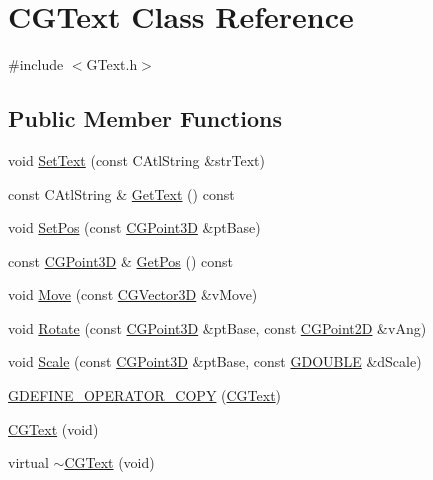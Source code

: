 \hypertarget{class_c_g_text}{}\section{C\+G\+Text Class Reference}
\label{class_c_g_text}


{\ttfamily \#include $<$G\+Text.\+h$>$}

\subsection*{Public Member Functions}
\begin{DoxyCompactItemize}
\item 
void \hyperlink{class_c_g_text_a916a400586bdfd83d2c8130fc397d2a7}{Set\+Text} (const C\+Atl\+String \&str\+Text)
\item 
const C\+Atl\+String \& \hyperlink{class_c_g_text_ad96b2b016d0806dd239425aad067026a}{Get\+Text} () const 
\item 
void \hyperlink{class_c_g_text_a787289d64e1be316b6031fd5075b2089}{Set\+Pos} (const \hyperlink{class_c_g_point3_d}{C\+G\+Point3\+D} \&pt\+Base)
\item 
const \hyperlink{class_c_g_point3_d}{C\+G\+Point3\+D} \& \hyperlink{class_c_g_text_a9c662dd01be29591a766ed8f370efbd5}{Get\+Pos} () const 
\item 
void \hyperlink{class_c_g_text_a238eaf5fe7681d776b8718e7c2596af5}{Move} (const \hyperlink{_g_point3_d_8h_aa7e73d39f4c991acb5a13c84b498366d}{C\+G\+Vector3\+D} \&v\+Move)
\item 
void \hyperlink{class_c_g_text_aa7365bc8979cb95e622644ca4c2b9b44}{Rotate} (const \hyperlink{class_c_g_point3_d}{C\+G\+Point3\+D} \&pt\+Base, const \hyperlink{class_c_g_point2_d}{C\+G\+Point2\+D} \&v\+Ang)
\item 
void \hyperlink{class_c_g_text_a0052e1b2f1b7ecc7300e7807974977d2}{Scale} (const \hyperlink{class_c_g_point3_d}{C\+G\+Point3\+D} \&pt\+Base, const \hyperlink{_g_types_8h_afd05ac85f90ee8e2a733928545462cd4}{G\+D\+O\+U\+B\+L\+E} \&d\+Scale)
\item 
\hyperlink{class_c_g_text_aef56eb63bfcdee79d2e46d722734af9b}{G\+D\+E\+F\+I\+N\+E\+\_\+\+O\+P\+E\+R\+A\+T\+O\+R\+\_\+\+C\+O\+P\+Y} (\hyperlink{class_c_g_text}{C\+G\+Text})
\item 
\hyperlink{class_c_g_text_aad0768d8ff092060eb4115764b7ae795}{C\+G\+Text} (void)
\item 
virtual \hyperlink{class_c_g_text_a516ab6c024cc3f6cfd09213592cc0f45}{$\sim$\+C\+G\+Text} (void)
\end{DoxyCompactItemize}


